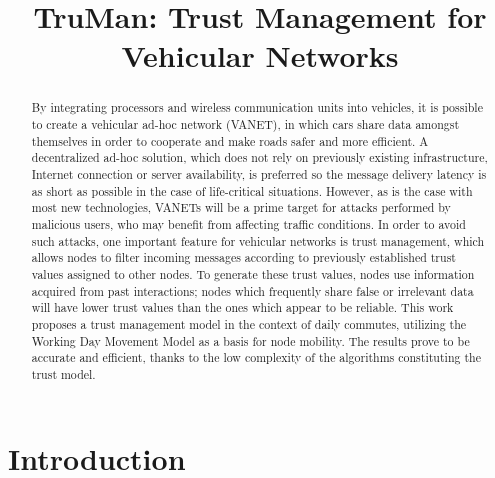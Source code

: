 \documentclass[conference]{IEEEtran}
\begin{document}
\title{TruMan: Trust Management for Vehicular Networks}


\author{
\and
{}
}


\maketitle

\begin{abstract}
By integrating processors and wireless communication units into vehicles, it is possible to create a vehicular ad-hoc network (VANET), in which cars share data amongst themselves in order to cooperate and make roads safer and more efficient.
A decentralized ad-hoc solution, which does not rely on previously existing infrastructure, Internet connection or server availability, is preferred so the message delivery latency is as short as possible in the case of life-critical situations.
However, as is the case with most new technologies, VANETs will be a prime target for attacks performed by malicious users, who may benefit from affecting traffic conditions.
In order to avoid such attacks, one important feature for vehicular networks is trust management, which allows nodes to filter incoming messages according to previously established trust values assigned to other nodes.
To generate these trust values, nodes use information acquired from past interactions; nodes which frequently share false or irrelevant data will have lower trust values than the ones which appear to be reliable.
This work proposes a trust management model in the context of daily commutes, utilizing the Working Day Movement Model as a basis for node mobility.
The results prove to be accurate and efficient, thanks to the low complexity of the algorithms constituting the trust model.
\end{abstract}


\IEEEpeerreviewmaketitle



\section{Introduction}
\label{section:introduction}
\end{document}
